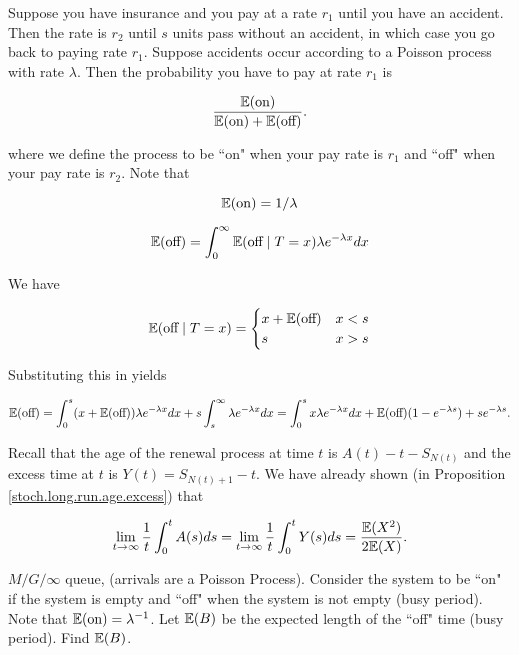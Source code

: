 \begin{example}Suppose you have insurance and you pay at a rate \(r_1\) until you have an accident. Then the rate is \(r_2\) until \(s\) units pass without an accident, in which case you go back to paying rate \(r_1\). Suppose accidents occur according to a Poisson process with rate \(\lambda\). Then the probability you have to pay at rate \(r_1\) is 

\[
\frac{\E(\text{on})}{\E(\text{on}) + \E(\text{off})}.
\]

where we define the process to be ``on" when your pay rate is \(r_1\) and ``off" when your pay rate is \(r_2\). Note that

\[
\E(\text{on}) = 1/\lambda
\]

\[
\E(\text{off}) = \int_0^\infty \E(\text{off} \mid T = x) \lambda e^{-\lambda x} dx
\]

We have

\[
 \E(\text{off} \mid T = x) = \begin{cases} 
 x + \E(\text{off}) & x < s \\
 s & x > s
 \end{cases}
\]

Substituting this in yields

\[
\E(\text{off}) = \int_0^s ( x + \E(\text{off})) \lambda e^{-\lambda x} dx +  s \int_s^\infty  \lambda e^{-\lambda x} dx = \int_0^s x \lambda e^{-\lambda x} dx + \E(\text{off}) (1 - e^{-\lambda s})  +  s e^{-\lambda s}.
\]

\end{example}

Recall that the age of the renewal process at time \(t\) is \(A(t) - t - S_{N(t)}\) and the excess time at \(t\) is \(Y(t) = S_{N(t) + 1} - t\). We have already shown (in Proposition \ref{stoch.long.run.age.excess}) that

\[
\lim_{t \to \infty} \frac{1}{t} \int_0^t A(s) ds =  \lim_{t \to \infty} \frac{1}{t} \int_0^t Y(s) ds  = \frac{\E(X^2)}{2 \E(X)}.
\]


\begin{example} \(M/G/\infty\) queue, (arrivals are a Poisson Process). Consider the system to be ``on" if the system is empty and ``off" when the system is not empty (busy period). Note that \(\E(\text{on}) = \lambda^{-1}\). Let \(\E(B)\) be the expected length of the ``off" time (busy period). Find \(\E(B)\).

\end{example}

